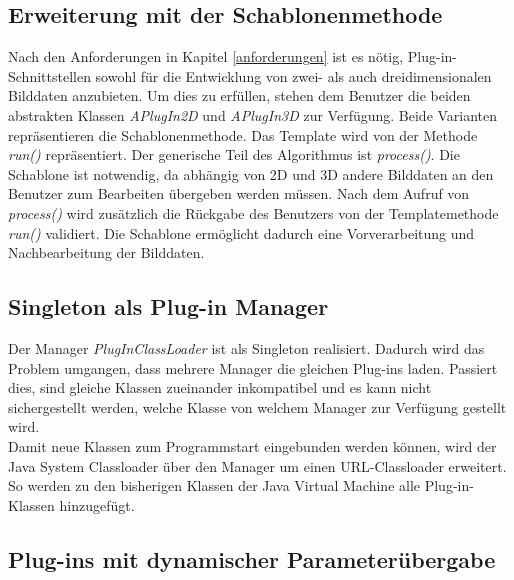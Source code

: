 \subsection{Erweiterung mit der Schablonenmethode}
Nach den Anforderungen in Kapitel \ref{anforderungen} ist es nötig, Plug-in-Schnittstellen sowohl für die Entwicklung von zwei- als auch dreidimensionalen Bilddaten anzubieten. Um dies zu erfüllen, stehen dem Benutzer die beiden abstrakten Klassen \textit{APlugIn2D} und \textit{APlugIn3D} zur Verfügung. Beide Varianten repräsentieren die Schablonenmethode. Das Template wird von der Methode \textit{run()} repräsentiert. Der generische Teil des Algorithmus ist \textit{process()}. Die Schablone ist notwendig, da abhängig von 2D und 3D andere Bilddaten an den Benutzer zum Bearbeiten übergeben werden müssen. Nach dem Aufruf von \textit{process()} wird zusätzlich die Rückgabe des Benutzers von der Templatemethode \textit{run()} validiert. Die Schablone ermöglicht dadurch eine Vorverarbeitung und Nachbearbeitung der Bilddaten.
 
\FloatBarrier
\subsection{Singleton als Plug-in Manager}
Der Manager \textit{PlugInClassLoader} ist als Singleton realisiert. Dadurch wird das Problem umgangen, dass mehrere Manager die gleichen Plug-ins laden. Passiert dies, sind gleiche Klassen zueinander inkompatibel und es kann nicht sichergestellt werden, welche Klasse von welchem Manager zur Verfügung gestellt wird.\\
Damit neue Klassen zum Programmstart eingebunden werden können, wird der Java System Classloader über den Manager um einen URL-Classloader erweitert. So werden zu den bisherigen Klassen der Java Virtual Machine alle Plug-in-Klassen hinzugefügt.

\FloatBarrier
\subsection{Plug-ins mit dynamischer Parameterübergabe} \label{genericdialog}

